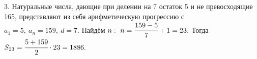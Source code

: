 3. Натуральные числа, дающие при делении на 7 остаток 5 и не превосходящие 165, представляют из себя арифметическую прогрессию с $a_1=5,\ a_n=159,\ d=7.$ Найдём $n:\ n=\cfrac{159-5}{7}+1=23.$ Тогда $S_{23}=\cfrac{5+159}{2}\cdot23=1886.$\\
